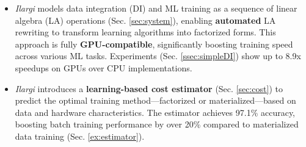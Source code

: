 \begin{itemize}
\vspace{-1mm}
\item \emph{Ilargi} models data integration (DI) and ML training as a sequence of linear algebra (LA) operations (Sec. \ref{sec:system}), enabling \textbf{automated} LA rewriting to transform learning algorithms into factorized forms. This approach is fully \textbf{GPU-compatible}, significantly boosting training speed across various ML tasks. Experiments (Sec. \ref{ssec:simpleDI}) show up to 8.9x speedups on GPUs over CPU implementations.

\item \emph{Ilargi} introduces a \textbf{learning-based cost estimator} (Sec. \ref{sec:cost}) to predict the optimal training method—factorized or materialized—based on data and hardware characteristics. The estimator achieves 97.1\% accuracy, boosting batch training performance by over 20\% compared to materialized data training (Sec. \ref{ex:estimator}).


\vspace{-1mm}
\end{itemize}



